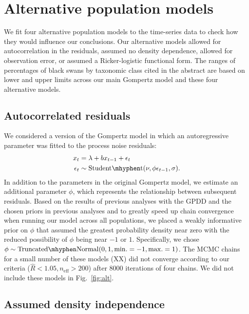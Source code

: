 \section{Alternative population models}

We fit four alternative population models to the time-series data to check how they would influence our conclusions. Our alternative models allowed for autocorrelation in the residuals, assumed no density dependence, allowed for observation error, or assumed a Ricker-logistic functional form. The ranges of percentages of black swans by taxonomic class cited in the abstract are based on lower and upper limits across our main Gompertz model and these four alternative models.

\subsection{Autocorrelated residuals}

We considered a version of the Gompertz model in which an autoregressive parameter was fitted to the process noise residuals: 
\begin{align*}
x_t &= \lambda + b x_{t-1} + \epsilon_t\\
\epsilon_t &\sim \mathrm{Student\mhyphen t}(\nu, \phi \epsilon_{t-1}, \sigma).
\end{align*}
In addition to the parameters in the original Gompertz model, we estimate an additional parameter $\phi$, which represents the relationship between subsequent residuals. Based on the results of previous analyses with the GPDD \citep[e.g.][]{connors2014} and the chosen priors in previous analyses \citep[e.g.][]{thorson2014a} and to greatly speed up chain convergence when running our model across all populations, we placed a weakly informative prior on $\phi$ that assumed the greatest probability density near zero with the reduced possibility of $\phi$ being near $-1$ or $1$. Specifically, we chose $\phi \sim \mathrm{Truncated\mhyphen Normal}(0, 1, \mathrm{min.} = -1, \mathrm{max.} = 1)$. The MCMC chains for a small number of these models (XX) did not converge according to our criteria ($\widehat{R} < 1.05, n_\mathrm{eff} > 200$) after 8000 iterations of four chains. We did not include these models in Fig.~\ref{fig:alt}.

\subsection{Assumed density independence}\label{assumed-density-independence}

